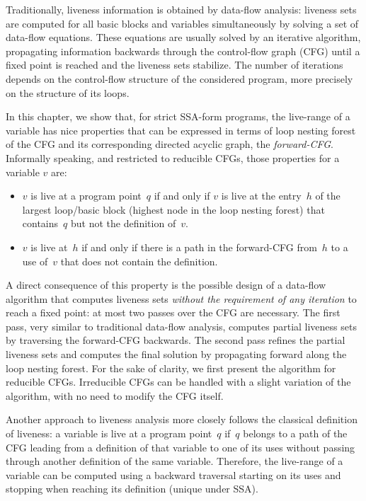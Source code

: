 
Traditionally, liveness information is obtained by data-flow analysis:
liveness sets are computed for all basic blocks and variables simultaneously by solving a set of data-flow equations.
These equations are usually solved by an iterative algorithm, propagating information backwards through the control-flow graph (CFG) until a fixed point is reached and the liveness sets stabilize.
The number of iterations depends on the control-flow structure of the considered program, more precisely on the structure of its loops.

In this chapter, we show that, for strict SSA-form programs, the live-range of a variable has nice properties that can be expressed in terms of loop nesting forest of the CFG and its corresponding directed acyclic graph, the \emph{forward-CFG}.
Informally speaking, and restricted to reducible CFGs, those properties for a variable $v$ are:
\begin{itemize}
\item
	$v$ is live at a program point~$q$ if and only if $v$ is live at the entry~$h$ of the largest loop/basic block (highest node in the loop nesting forest) that contains~$q$ but not the definition of~$v$.
\item
	$v$ is live at~$h$ if and only if there is a path in the forward-CFG from~$h$ to a use of~$v$ that does not contain the definition.
\end{itemize}


A direct consequence of this property is the possible design of a data-flow algorithm that computes liveness sets \emph{without the requirement of any iteration} to reach a fixed point:
at most two passes over the CFG are necessary.
The first pass, very similar to traditional data-flow analysis, computes partial liveness sets by traversing the forward-CFG backwards.
The second pass refines the partial liveness sets and computes the final solution by propagating forward along the loop nesting forest.
For the sake of clarity, we first present the algorithm for reducible CFGs.
Irreducible CFGs can be handled with a slight variation of the algorithm, with no need to modify the CFG itself.

Another approach to liveness analysis more closely follows the classical definition of liveness:
a variable is live at a program point~$q$ if~$q$ belongs to a path of the CFG leading from a definition of that variable to one of its uses without passing through another definition of the same variable.
Therefore, the live-range of a variable can be computed using a backward traversal starting on its uses and stopping when reaching its definition (unique under SSA).

